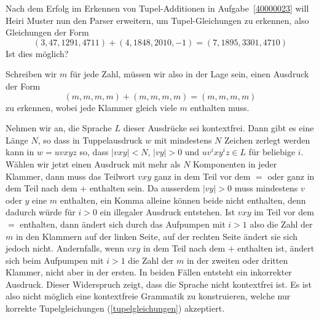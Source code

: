 Nach dem Erfolg im Erkennen von Tupel-Additionen in
Aufgabe~\ref{40000023}
will Heiri Muster nun den Parser erweitern, um Tupel-Gleichungen
zu erkennen, also Gleichungen der Form
\[
(3,47,1291,4711)+(4,1848,2010,-1)=(7,1895,3301,4710)
\]
Ist dies möglich?

\begin{loesung}
Schreiben wir $m$ für jede Zahl, müssen wir also in der Lage
sein, einen Ausdruck der Form
\begin{equation}
(m,m,m,m)+(m,m,m,m)=(m,m,m,m)
\label{tupelgleichungen}
\end{equation}
zu erkennen, wobei jede Klammer gleich viele $m$ enthalten muss.

Nehmen wir an, die Sprache $L$ dieser Ausdrücke sei kontextfrei.
Dann gibt
es eine Länge $N$, so dass in Tuppelausdruck $w$ mit mindestens
$N$ Zeichen zerlegt werden kann in $w=uvxyz$ so, dass $|vxy|<N$,
$|vy|>0$ und $uv^ixy^iz\in L$ für beliebige $i$. Wählen wir jetzt
einen Ausdruck mit mehr als $N$ Komponenten in jeder Klammer,
dann muss das Teilwort $vxy$ ganz in dem Teil vor dem $=$ oder ganz
in dem Teil nach dem $+$ enthalten sein. Da ausserdem $|vy|>0$
muss mindestens $v$ oder $y$ eine $m$ enthalten, ein Komma alleine
können beide nicht enthalten, denn dadurch würde für $i>0$
ein illegaler Ausdruck entstehen. Ist $vxy$ im Teil vor dem $=$
enthalten, dann ändert sich durch das Aufpumpen mit $i>1$ also
die Zahl der $m$ in den Klammern auf der linken Seite, auf
der rechten Seite ändert sie sich jedoch nicht. Andernfalls,
wenn $vxy$ in dem Teil nach dem $+$ enthalten ist, ändert
sich beim Aufpumpen mit $i>1$ die Zahl der $m$ in der zweiten
oder dritten Klammer, nicht aber in der ersten. In beiden Fällen
entsteht ein inkorrekter Ausdruck. Dieser Widerspruch zeigt, dass
die Sprache nicht kontextfrei ist. Es ist also nicht möglich
eine kontextfreie Grammatik zu konstruieren, welche nur korrekte
Tupelgleichungen (\ref{tupelgleichungen}) akzeptiert.
\end{loesung}

